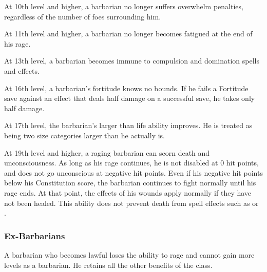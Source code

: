  At 10th level and higher, a barbarian no longer suffers overwhelm penalties, regardless of the number of foes surrounding him.

 At 11th level and higher, a barbarian no longer becomes fatigued at the end of his rage.

 At 13th level, a barbarian becomes immune to compulsion and domination spells and effects.

 At 16th level, a barbarian's fortitude knows no bounds. If he fails a Fortitude save against an effect that deals half damage on a successful save, he takes only half damage.

 At 17th level, the barbarian's larger than life ability improves. He is treated as being two size categories larger than he actually is.

 At 19th level and higher, a raging barbarian can scorn death and unconsciousness. As long as his rage continues, he is not disabled at 0 hit points, and does not go unconscious at negative hit points. Even if his negative hit points below his Constitution score, the barbarian continues to fight normally until his rage ends. At that point, the effects of his wounds apply normally if they have not been healed. This ability does not prevent death from spell effects such as  or .

\subsubsection{Ex-Barbarians}
A barbarian who becomes lawful loses the ability to rage and cannot
gain more levels as a barbarian. He retains all the other benefits of
the class.

